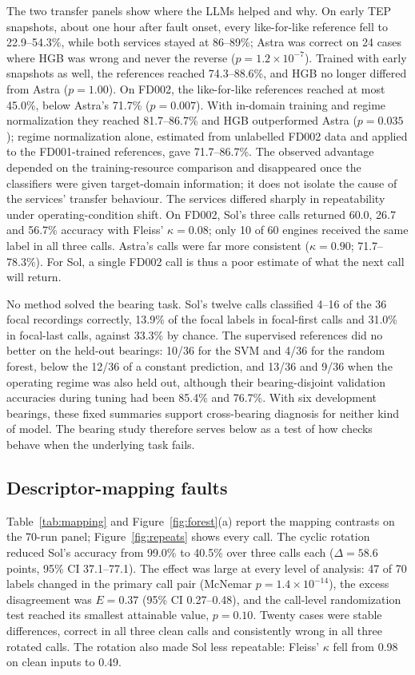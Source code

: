 \documentclass[11pt,a4paper]{article}
\begin{document}
The two transfer panels show where the LLMs helped and why. On early TEP snapshots, about one hour after fault onset, every like-for-like reference fell to 22.9--54.3\%, while both services stayed at 86--89\%; Astra was correct on 24 cases where HGB was wrong and never the reverse ($p=1.2\times10^{-7}$). Trained with early snapshots as well, the references reached 74.3--88.6\%, and HGB no longer differed from Astra ($p=1.00$). On FD002, the like-for-like references reached at most 45.0\%, below Astra's 71.7\% ($p=0.007$). With in-domain training and regime normalization they reached 81.7--86.7\% and HGB outperformed Astra ($p=0.035$); regime normalization alone, estimated from unlabelled FD002 data and applied to the FD001-trained references, gave 71.7--86.7\%. The observed advantage depended on the training-resource comparison and disappeared once the classifiers were given target-domain information; it does not isolate the cause of the services' transfer behaviour. The services differed sharply in repeatability under operating-condition shift. On FD002, Sol's three calls returned 60.0, 26.7 and 56.7\% accuracy with Fleiss' $\kappa=0.08$; only 10 of 60 engines received the same label in all three calls. Astra's calls were far more consistent ($\kappa=0.90$; 71.7--78.3\%). For Sol, a single FD002 call is thus a poor estimate of what the next call will return.

No method solved the bearing task. Sol's twelve calls classified 4--16 of the 36 focal recordings correctly, 13.9\% of the focal labels in focal-first calls and 31.0\% in focal-last calls, against 33.3\% by chance. The supervised references did no better on the held-out bearings: 10/36 for the SVM and 4/36 for the random forest, below the 12/36 of a constant prediction, and 13/36 and 9/36 when the operating regime was also held out, although their bearing-disjoint validation accuracies during tuning had been 85.4\% and 76.7\%. With six development bearings, these fixed summaries support cross-bearing diagnosis for neither kind of model. The bearing study therefore serves below as a test of how checks behave when the underlying task fails.

\subsection{Descriptor-mapping faults}
Table~\ref{tab:mapping} and Figure~\ref{fig:forest}(a) report the mapping contrasts on the 70-run panel; Figure~\ref{fig:repeats} shows every call. The cyclic rotation reduced Sol's accuracy from 99.0\% to 40.5\% over three calls each ($\Delta=58.6$ points, 95\% CI 37.1--77.1). The effect was large at every level of analysis: 47 of 70 labels changed in the primary call pair (McNemar $p=1.4\times10^{-14}$), the excess disagreement was $E=0.37$ (95\% CI 0.27--0.48), and the call-level randomization test reached its smallest attainable value, $p=0.10$. Twenty cases were stable differences, correct in all three clean calls and consistently wrong in all three rotated calls. The rotation also made Sol less repeatable: Fleiss' $\kappa$ fell from 0.98 on clean inputs to 0.49.
\end{document}
